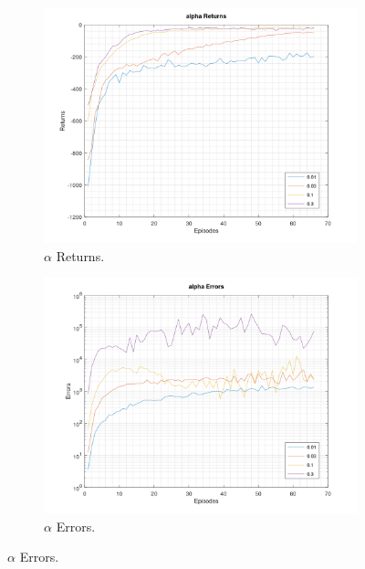 \documentclass[a4paper,11pt]{article}
\begin{document}
\begin{figure}[h!]
	\centering
	\begin{subfigure}[b]{0.4\linewidth}
		\includegraphics[width=\linewidth]{alpha-returns.png}
		\caption{$\alpha$ Returns.}
	\end{subfigure}
	\begin{subfigure}[b]{0.4\linewidth}
		\includegraphics[width=\linewidth]{alpha-errors.png}
		\caption{$\alpha$ Errors.}
	\end{subfigure}


\end{figure}
\end{document}
